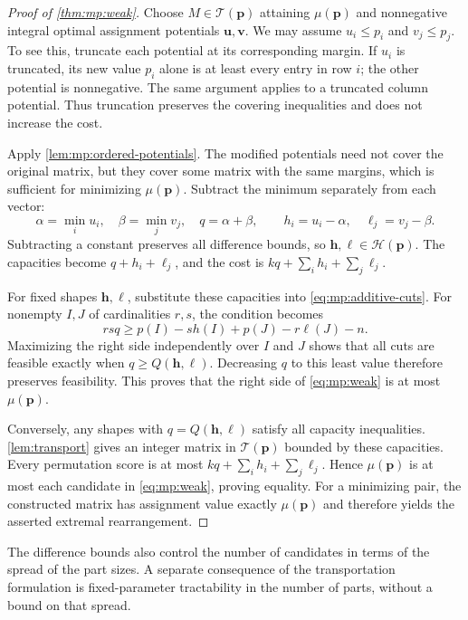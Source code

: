 \documentclass[11pt,reqno]{amsart}
\numberwithin{equation}{section}
\theoremstyle{definition}
\theoremstyle{remark}
\begin{document}
\begin{proof}[Proof of \cref{thm:mp:weak}]
Choose $M\in\mathcal T(\mathbf p)$ attaining $\mu(\mathbf p)$ and
nonnegative integral optimal assignment potentials $\mathbf u,\mathbf v$.
We may assume $u_i\le p_i$ and $v_j\le p_j$. To see this, truncate each
potential at its corresponding margin. If $u_i$ is truncated, its new
value $p_i$ alone is at least every entry in row $i$; the other potential
is nonnegative. The same argument applies to a truncated column
potential. Thus truncation preserves the covering inequalities and
does not increase the cost.

Apply \cref{lem:mp:ordered-potentials}. The modified potentials
need not cover the original matrix, but they cover some matrix with
the same margins, which is sufficient for minimizing
$\mu(\mathbf p)$. Subtract the minimum separately from each vector:
\[
 \alpha=\min_i u_i,\quad \beta=\min_jv_j,\quad q=\alpha+\beta,
 \qquad h_i=u_i-\alpha,\quad \ell_j=v_j-\beta.
\]
Subtracting a constant preserves all difference bounds, so
$\mathbf h,\boldsymbol\ell\in\mathcal H(\mathbf p)$. The
capacities become $q+h_i+\ell_j$, and the cost is
$kq+\sum_i h_i+\sum_j\ell_j$.

For fixed shapes $\mathbf h,\boldsymbol\ell$, substitute these
capacities into \eqref{eq:mp:additive-cuts}. For nonempty $I,J$ of
cardinalities $r,s$, the condition becomes
\[
 rsq\ge p(I)-s h(I)+p(J)-r\ell(J)-n.
\]
Maximizing the right side independently over $I$ and $J$ shows that
all cuts are feasible exactly when $q\ge Q(\mathbf h,\boldsymbol\ell)$.
Decreasing $q$ to this least value therefore preserves feasibility.
This proves that the right side of \eqref{eq:mp:weak} is at most
$\mu(\mathbf p)$.

Conversely, any shapes with $q=Q(\mathbf h,\boldsymbol\ell)$ satisfy
all capacity inequalities. \cref{lem:transport} gives an integer
matrix in $\mathcal T(\mathbf p)$ bounded by these capacities.
Every permutation score is at most
$kq+\sum_i h_i+\sum_j\ell_j$. Hence $\mu(\mathbf p)$ is at most
each candidate in \eqref{eq:mp:weak}, proving equality. For a minimizing
pair, the constructed matrix has assignment value exactly
$\mu(\mathbf p)$ and therefore yields the asserted extremal
rearrangement.
\end{proof}

The difference bounds also control the number of candidates in terms
of the spread of the part sizes. A separate consequence of the
transportation formulation is fixed-parameter tractability in the
number of parts, without a bound on that spread.
\end{document}
